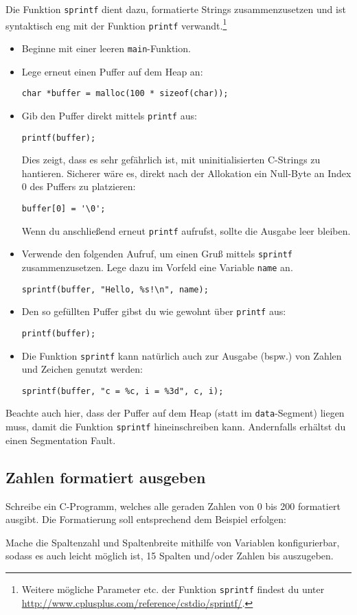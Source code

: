 Die Funktion \lstinline{sprintf} dient dazu, formatierte Strings zusammenzusetzen und ist syntaktisch eng mit der Funktion \lstinline{printf} verwandt.\footnote{Weitere mögliche Parameter etc. der Funktion \lstinline{sprintf} findest du unter \url{http://www.cplusplus.com/reference/cstdio/sprintf/}.}
%
\begin{itemize}
\item
Beginne mit einer leeren \lstinline|main|-Funktion.
\item 
Lege erneut einen Puffer auf dem Heap an:
\begin{lstlisting}
char *buffer = malloc(100 * sizeof(char));
\end{lstlisting}
\item 
Gib den Puffer direkt mittels \lstinline|printf| aus:
\begin{lstlisting}
printf(buffer);
\end{lstlisting}
Dies zeigt, dass es sehr gefährlich ist, mit uninitialisierten C-Strings zu hantieren.
Sicherer wäre es, direkt nach der Allokation ein Null-Byte an Index 0 des Puffers zu platzieren:
\begin{lstlisting}
buffer[0] = '\0';
\end{lstlisting}
Wenn du anschließend erneut \lstinline|printf| aufrufst, sollte die Ausgabe leer bleiben.
\item 
Verwende den folgenden Aufruf, um einen Gruß mittels \lstinline|sprintf| zusammenzusetzen.
Lege dazu im Vorfeld eine Variable \lstinline|name| an.
\begin{lstlisting}
sprintf(buffer, "Hello, %s!\n", name);
\end{lstlisting}
\item 
Den so gefüllten Puffer gibst du wie gewohnt über \lstinline|printf| aus:
\begin{lstlisting}
printf(buffer);
\end{lstlisting}
\item 
Die Funktion \lstinline|sprintf| kann natürlich auch zur Ausgabe (bspw.) von Zahlen und Zeichen genutzt werden:
\begin{lstlisting}
sprintf(buffer, "c = %c, i = %3d", c, i);
\end{lstlisting}
\end{itemize}
Beachte auch hier, dass der Puffer auf dem Heap (statt im \texttt{data}-Segment) liegen muss, damit die Funktion \lstinline|sprintf| hineinschreiben kann.
Andernfalls erhältst du einen Segmentation Fault.

\subsection{Zahlen formatiert ausgeben}
\label{sec:CFormatNumbers}
Schreibe ein C-Programm, welches alle geraden Zahlen von 0 bis 200 formatiert ausgibt.
Die Formatierung soll entsprechend dem Beispiel erfolgen:
%
  
%
Mache die Spaltenzahl und Spaltenbreite mithilfe von Variablen konfigurierbar, sodass es auch leicht möglich ist, 15 Spalten und/oder Zahlen bis  auszugeben.

